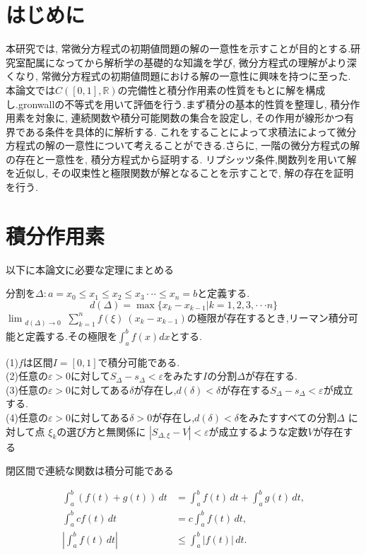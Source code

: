 \documentclass[12pt,xelatex,ja=standard]{bxjsarticle}
\begin{document}
\section{はじめに}
本研究では, 常微分方程式の初期値問題の解の一意性を示すことが目的とする.研究室配属になってから解析学の基礎的な知識を学び, 微分方程式の理解がより深くなり, 常微分方程式の初期値問題における解の一意性に興味を持つに至った. 本論文では$C([0,1],\mathbb{R})$の完備性と積分作用素の性質をもとに解を構成し.gronwallの不等式を用いて評価を行う.まず積分の基本的性質を整理し, 積分作用素を対象に, 連続関数や積分可能関数の集合を設定し, その作用が線形かつ有界である条件を具体的に解析する.
これをすることによって求積法によって微分方程式の解の一意性について考えることができる.さらに, 一階の微分方程式の解の存在と一意性を, 積分方程式から証明する.
リプシッツ条件,関数列を用いて解を近似し, その収束性と極限関数が解となることを示すことで, 解の存在を証明を行う.



\section{積分作用素}
\label{sec:積分作用素}
以下に本論文に必要な定理にまとめる
\begin{Lemma}[リーマン積分]
分割を$\Delta:a=x_{0}\leq x_{1} \leq x_{2} \leq x_{3} \cdot \cdot \cdot  \leq x_{n}=b$と定義する.
\[d(\Delta)=\max\{x_{k}-x_{k-1}|k=1,2,3,\cdot \cdot\cdot n \}\]
    $\displaystyle \lim_{\substack{d(\Delta) \to 0}} \sum_{k=1}^{n} f(\xi) \ (x_k - x_{k-1})$の極限が存在するとき,リーマン積分可能と定義する.その極限を$\displaystyle \int_{a}^{b} f(x) dx$とする.
\end{Lemma}
\begin{Lemma}
(1)$f$は区間$I=[0,1]$で積分可能である.\\
(2)任意の$\varepsilon>0$に対して$S_{\Delta}-s_{\Delta}<\varepsilon$をみたす$I$の分割$\Delta $が存在する.\\
(3)任意の$\varepsilon>0$に対してある$\delta$が存在し,$d(\delta)<\delta$が存在する$ S_{\Delta}-s_{\Delta}<\varepsilon$が成立する.\\
(4)任意の$\varepsilon>0$に対してある$\delta>0$が存在し,$d(\delta)<\delta$をみたすすべての分割$\Delta$ に対して点 $\xi_{k}$の選び方と無関係に
$|S_{\Delta,\xi}-V|<\varepsilon$が成立するような定数$V$が存在する
\end{Lemma}
\begin{Lemma}
閉区間で連続な関数は積分可能である
\end{Lemma}
\begin{Lemma}[定積分の基本的性質]
\begin{align}
\displaystyle \int_{a}^{b} (f(t) + g(t)) \, dt &= \displaystyle \int_{a}^{b} f(t) \, dt + \displaystyle \int_{a}^{b} g(t) \, dt, \\
\displaystyle \int_{a}^{b} c f(t) \, dt &= c \displaystyle \int_{a}^{b} f(t) \, dt, \\
\displaystyle \left| \int_{a}^{b} f(t) \, dt \right| &\leq \displaystyle \int_{a}^{b} |f(t)| \, dt.
\end{align}

\end{Lemma}
\end{document}
